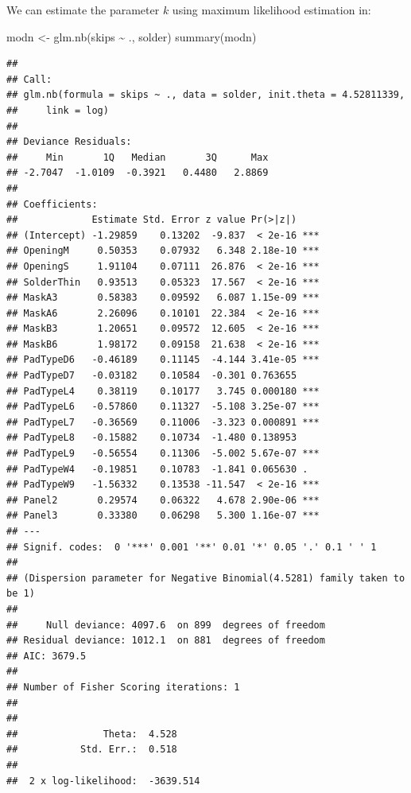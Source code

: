 \documentclass[
  ignorenonframetext,
]{beamer}
\newenvironment{Shaded}{\begin{snugshade}}{\end{snugshade}}
\newcommand{\FunctionTok}[1]{\textcolor[rgb]{0.00,0.00,0.00}{#1}}
\newcommand{\NormalTok}[1]{#1}
\newcommand{\OtherTok}[1]{\textcolor[rgb]{0.56,0.35,0.01}{#1}}
\newcommand{\SpecialCharTok}[1]{\textcolor[rgb]{0.00,0.00,0.00}{#1}}
\begin{document}
\begin{frame}[fragile]{}
\protect\hypertarget{section-26}{}
We can estimate the parameter \(k\) using maximum likelihood estimation
in:

\tiny

\begin{Shaded}
\begin{Highlighting}[]
\NormalTok{modn }\OtherTok{\textless{}{-}} \FunctionTok{glm.nb}\NormalTok{(skips }\SpecialCharTok{\textasciitilde{}}\NormalTok{ ., solder)}
\FunctionTok{summary}\NormalTok{(modn)}
\end{Highlighting}
\end{Shaded}

\begin{verbatim}
## 
## Call:
## glm.nb(formula = skips ~ ., data = solder, init.theta = 4.52811339, 
##     link = log)
## 
## Deviance Residuals: 
##     Min       1Q   Median       3Q      Max  
## -2.7047  -1.0109  -0.3921   0.4480   2.8869  
## 
## Coefficients:
##             Estimate Std. Error z value Pr(>|z|)    
## (Intercept) -1.29859    0.13202  -9.837  < 2e-16 ***
## OpeningM     0.50353    0.07932   6.348 2.18e-10 ***
## OpeningS     1.91104    0.07111  26.876  < 2e-16 ***
## SolderThin   0.93513    0.05323  17.567  < 2e-16 ***
## MaskA3       0.58383    0.09592   6.087 1.15e-09 ***
## MaskA6       2.26096    0.10101  22.384  < 2e-16 ***
## MaskB3       1.20651    0.09572  12.605  < 2e-16 ***
## MaskB6       1.98172    0.09158  21.638  < 2e-16 ***
## PadTypeD6   -0.46189    0.11145  -4.144 3.41e-05 ***
## PadTypeD7   -0.03182    0.10584  -0.301 0.763655    
## PadTypeL4    0.38119    0.10177   3.745 0.000180 ***
## PadTypeL6   -0.57860    0.11327  -5.108 3.25e-07 ***
## PadTypeL7   -0.36569    0.11006  -3.323 0.000891 ***
## PadTypeL8   -0.15882    0.10734  -1.480 0.138953    
## PadTypeL9   -0.56554    0.11306  -5.002 5.67e-07 ***
## PadTypeW4   -0.19851    0.10783  -1.841 0.065630 .  
## PadTypeW9   -1.56332    0.13538 -11.547  < 2e-16 ***
## Panel2       0.29574    0.06322   4.678 2.90e-06 ***
## Panel3       0.33380    0.06298   5.300 1.16e-07 ***
## ---
## Signif. codes:  0 '***' 0.001 '**' 0.01 '*' 0.05 '.' 0.1 ' ' 1
## 
## (Dispersion parameter for Negative Binomial(4.5281) family taken to be 1)
## 
##     Null deviance: 4097.6  on 899  degrees of freedom
## Residual deviance: 1012.1  on 881  degrees of freedom
## AIC: 3679.5
## 
## Number of Fisher Scoring iterations: 1
## 
## 
##               Theta:  4.528 
##           Std. Err.:  0.518 
## 
##  2 x log-likelihood:  -3639.514
\end{verbatim}
\end{frame}
\end{document}
